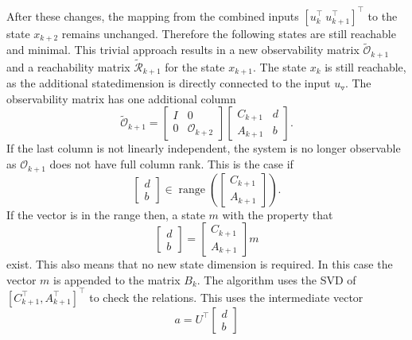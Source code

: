 \documentclass[doctype=mastersthesis,BCOR=15mm,biblatex]{ldvbook}%
\DeclareMathOperator{\range}{range}
\newcommand{\R}{\mathcal{R}} %
\newcommand{\Ob}{\mathcal{O}} %
\newcommand{\eye}{I} %
\newcommand{\m}{\triangledown} %
\begin{document}
After these changes, the mapping from the combined inputs $[u_k^\top \: u_{k+1}^\top]^\top$
to the state $x_{k+2}$ remains unchanged. Therefore the following states are still reachable and minimal.
This trivial approach results in a new observability matrix $\tilde{\Ob}_{k+1}$ and a reachability matrix $\tilde{\R}_{k+1}$ for the state $x_{k+1}$.
The state $x_k$ is still reachable, as the additional statedimension is directly connected to the input $u_\m$.
The observability matrix has one additional column
\begin{equation}\label{eq:strucure_mover}
	\tilde{\Ob}_{k+1}
	=
	\begin{bmatrix}
	\eye & 0\\ 0 &\Ob_{k+2}
	\end{bmatrix}
	\begin{bmatrix}
	C_{k+1} & d\\
	A_{k+1} & b
	\end{bmatrix}
	.
\end{equation}
If the last column is not linearly independent, the system is no longer observable as $\Ob_{k+1}$ does not have full column rank.
This is the case if
\begin{equation}
	\begin{bmatrix}
	d\\b
	\end{bmatrix}
	\in
	\range\left(
	\begin{bmatrix}
	C_{k+1}\\A_{k+1}
	\end{bmatrix}\right).
\end{equation}
If the vector is in the range then, a state $m$ with the property that
\begin{equation}
	\begin{bmatrix}
	d\\b
	\end{bmatrix}
	=
	\begin{bmatrix}
	C_{k+1}\\A_{k+1}
	\end{bmatrix}
	m
\end{equation}
exist.
This also means that no new state dimension is required.
In this case the vector $m$ is appended to the matrix $B_{k}$.
The algorithm uses the SVD of $[C_{k+1}^\top,A_{k+1}^\top]^\top$ to check the relations.
This uses the intermediate vector 
\begin{equation}
	a = U^\top 	
	\begin{bmatrix}
	d\\b
	\end{bmatrix}
\end{equation} 
\end{document}
